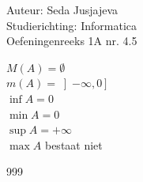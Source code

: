 \documentclass[a4paper]{article}
\begin{document}
\noindent \large Auteur: Seda Jusjajeva\\
\noindent \large Studierichting: Informatica\\
\noindent \large Oefeningenreeks 1A nr. 4.5\\

\medskip

\normalsize

$M(A) = \emptyset $ \\

$m(A) = \left]-\infty, 0 \right]$\\

$\inf A = 0$\\

$\min A = 0$\\

$\sup A = +\infty$ \\

$\max A $ bestaat niet\\



\begin{thebibliography}{999}
\end{thebibliography}
\end{document}
